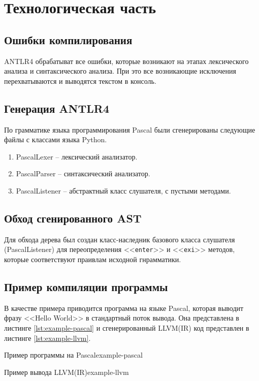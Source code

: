 \chapter{Технологическая часть}

\section{Ошибки компилирования}

ANTLR4 обрабатыват все ошибки, которые возникают на этапах лексического анализа и синтаксического анализа. При это все возникающие исключения перехватываются и выводятся текстом в консоль.


\section{Генерация ANTLR4}

По грамматике языка программирования Pascal были сгенерированы следующие файлы с классами языка Python.

\begin{enumerate}
	\item PascalLexer -- лексический анализатор.
	\item PascalParser -- синтаксический анализатор.
	\item PascalListener -- абстрактный класс слушателя, с пустыми методами.
\end{enumerate}


\section{Обход сгенированного AST}

Для обхода дерева был создан класс-наследник базового класса слушателя (PascalListener) для переопределения <<\texttt{enter}>> и <<\texttt{exi}>> методов, которые соответствуют праивлам исходной гнрамматики.


\section{Пример компиляции программы}

В качестве примера приводится программа на языке Pascal, которая выводит фразу <<Hello World>> в стандартный поток вывода. Она представлена в листинге \ref{lst:example-pascal} и сгенерированный LLVM(IR) код представлен в листинге \ref{lst:example-llvm}.

	{}{Пример программы на Pascal}{example-pascal}{}

	{}{Пример вывода LLVM(IR)}{example-llvm}{}
